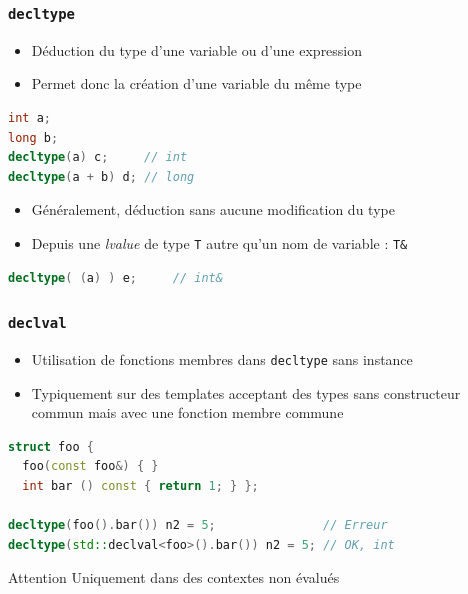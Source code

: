 \documentclass[C++.tex]{subfiles}
\begin{document}
\begin{frame}[fragile]
	\frametitle{\lstinline|decltype|}
	\begin{itemize}
		\item Déduction du type d'une variable ou d'une expression
		\item Permet donc la création d'une variable du même type
	\end{itemize}

	\begin{lstlisting}[language=C++]
int a;
long b;
decltype(a) c;     // int
decltype(a + b) d; // long\end{lstlisting}

	\begin{itemize}
		\item Généralement, déduction sans aucune modification du type


		\item Depuis une \textit{lvalue} de type \lstinline|T| autre qu'un nom de variable : \lstinline|T&|
	\end{itemize}

	\begin{lstlisting}[language=C++]
decltype( (a) ) e;     // int&\end{lstlisting}

\end{frame}

\begin{frame}[fragile]
	\frametitle{\lstinline|declval|}
	\begin{itemize}
		\item Utilisation de fonctions membres dans \lstinline|decltype| sans instance
		\item Typiquement sur des templates acceptant des types sans constructeur commun mais avec une fonction membre commune
	\end{itemize}
	
	\begin{lstlisting}[language=C++]
struct foo {
  foo(const foo&) { }
  int bar () const { return 1; } };

decltype(foo().bar()) n2 = 5;               // Erreur
decltype(std::declval<foo>().bar()) n2 = 5; // OK, int\end{lstlisting}

	\begin{alertblock}{Attention}
		Uniquement dans des contextes non évalués
	\end{alertblock}
\end{frame}
\end{document}
